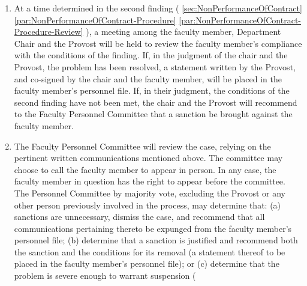 \begin{enumerate}[label=\alph*)]
{\begin{enumerate}[label=\arabic*)]
{								\label{par:NonPerformanceOfContract-Procedure-Review}
								At a time determined in the finding (
								\ref{sec:NonPerformanceOfContract}
								\ref{par:NonPerformanceOfContract-Procedure}
								\ref{par:NonPerformanceOfContract-Procedure-Compliance}
								), a meeting among the faculty member, Department Chair, and the Provost will be held to review the faculty member's compliance with the conditions of the finding.  If, in the judgment of the chair and the Provost, the problem has been resolved, a statement written and signed by the Provost, and co-signed by the Department Chair and the faculty member, will be placed in the faculty member's personnel file.  If, however, the chair and the Provost determine that the conditions of the first finding have not been satisfied, a second finding written by the Provost and co-signed by the chair will be placed in the faculty member's personnel file.  This finding will describe the problem and establish the conditions for its resolution.}
							\item{At a time determined in the second finding (
								\ref{sec:NonPerformanceOfContract}
								\ref{par:NonPerformanceOfContract-Procedure}
								\ref{par:NonPerformanceOfContract-Procedure-Review}
								), a meeting among the faculty member, Department Chair and the Provost will be held to review the faculty member's compliance with the conditions of the finding.  If, in the judgment of the chair and the Provost, the problem has been resolved, a statement written by the Provost, and co-signed by the chair and the faculty member, will be placed in the faculty member's personnel file.  If, in their judgment, the conditions of the second finding have not been met, the chair and the Provost will recommend to the Faculty Personnel Committee that a sanction be brought against the faculty member.}
							\item{The Faculty Personnel Committee
								will review the case, relying on the pertinent
								written communications mentioned above.  The
								committee may choose to call the faculty member to
								appear in person.  In any case, the faculty member
								in question has the right to appear before the
								committee.  The Personnel Committee by majority
								vote, excluding the Provost or any other person
								previously involved in the process, may determine
								that: (a) sanctions are unnecessary, dismiss the case, and recommend that all communications pertaining thereto be expunged from the faculty member's personnel file; (b) determine that a sanction is justified and recommend both the sanction and the conditions for its removal (a statement thereof to be placed in the faculty member's personnel file); or (c) determine that the problem is severe enough to warrant suspension (
}
\end{enumerate}}
\end{enumerate}
